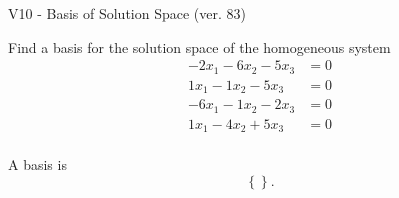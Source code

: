 \begin{exercise}
  \begin{exerciseTitle}V10 - Basis of Solution Space (ver. 83)\end{exerciseTitle}
  \begin{exerciseStatement}
    Find a basis for the solution space of the homogeneous system 
\begin{align*}
 -2 x_ 1 -6 x_ 2 -5 x_ 3 &= 0  \\ 
  1 x_ 1 -1 x_ 2 -5 x_ 3 &= 0  \\ 
  -6 x_ 1 -1 x_ 2 -2 x_ 3 &= 0  \\ 
  1 x_ 1 -4 x_ 2 + 5 x_ 3 &= 0  \\ 
 \end{align*}


 
  \end{exerciseStatement}

  \begin{exerciseAnswer}
   A basis is   
\[\left\{\right\}.\]

  


  \end{exerciseAnswer}
\end{exercise}
